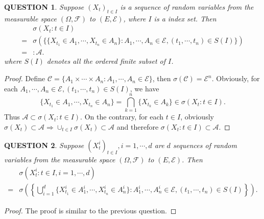 \documentclass[12pt]{article}
\renewcommand{\(}{\left(}%
\renewcommand{\)}{\right)}%
\renewcommand{\[}{\left[}%
\renewcommand{\]}{\right]}%
\renewcommand{\a}{\mathscr{A}}
\newcommand{\f}{\mathscr{F}}
\newcommand{\e}{\mathscr{E}}
\newtheorem{question}{QUESTION}[section]}
\newtheorem{proof}{Proof.}}
\begin{document}
  \begin{question}
   Suppose $(X_t)_{t\in I}$ is a sequence of random variables from the measurable space $(\Omega,\f )$ to $(E,\e)$, where $I$ is a index set. Then
   \begin{equation*}
    \begin{split}
     &\sigma(X_t:t\in I)\\
     =&\sigma\(\{\{X_{t_1}\in A_1,\cdots,X_{t_n}\in A_n\}:A_1,\cdots,A_n \in \e,(t_1,\cdots,t_n )\in S(I) \} \)\\
     =&:\a.
    \end{split}
   \end{equation*}
   where $S(I)$ denotes all the ordered finite subset of $I$.
  \end{question}
  \begin{proof}
   Define $\mathscr{C}=\{A_1\times\cdots\times A_n:A_1,\cdots,A_n \in \e \}$, then $\sigma(\mathscr{C})=\e^n$. Obviously, for each $A_1,\cdots,A_n \in \e,(t_1,\cdots,t_n )\in S(I)$, we have
   \begin{equation*}
    \{X_{t_1}\in A_1,\cdots,X_{t_n}\in A_n\}=\bigcap_{k=1}^n\{X_{t_k}\in A_k\}\in \sigma(X_t:t\in I).
   \end{equation*}
   Thus $\a\subset \sigma(X_t:t\in I)$. On the contrary, for each $t\in I$, obviously $\sigma(X_t)\subset \a\Longrightarrow \cup_{t\in I}\sigma(X_t)\subset\a$ and therefore $\sigma(X_t:t\in I)\subset\a$.
  \end{proof}
  
  \begin{question}
  	Suppose $(X_t^i)_{t\in I},i=1,\cdots,d$ are $d$ sequences of random variables from the measurable space $(\Omega,\f )$ to $(E,\e)$. Then 
  	\begin{equation*}
    \begin{split}
     &\sigma(X_t^i:t\in I,i=1,\cdots,d)\\
     =&\sigma\(\left\{\bigcup_{i=1}^d \{X_{t_1}^i\in A_1^i,\cdots,X_{t_n}^i\in A_n^i\}:A_1^i,\cdots,A_n^i \in \e,(t_1,\cdots,t_n )\in S(I) \right\} \).
    \end{split}
   \end{equation*}
  \end{question}
  \begin{proof}
  	The proof is similar to the previous question.
  \end{proof}
\end{document}
